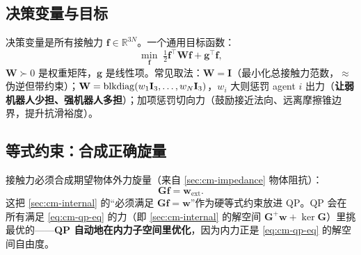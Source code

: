 \subsection{决策变量与目标}
\label{sec:cm-qp-obj}
决策变量是所有接触力 $\mathbf{f}\in\mathbb{R}^{3N}$。一个通用目标函数：
\begin{equation}
  \min_{\mathbf{f}}\;\tfrac{1}{2}\mathbf{f}^\top\mathbf{W}\mathbf{f}+\mathbf{g}^\top\mathbf{f},
  \label{eq:cm-qp-cost}
\end{equation}
$\mathbf{W}\succ 0$ 是权重矩阵，$\mathbf{g}$ 是线性项。常见取法：$\mathbf{W}=\mathbf{I}$（最小化总接触力范数，$\approx$ 伪逆但带约束）；$\mathbf{W}=\operatorname{blkdiag}(w_1\mathbf{I}_3,\dots,w_N\mathbf{I}_3)$，$w_i$ 大则惩罚 agent $i$ 出力（\textbf{让弱机器人少担、强机器人多担}）；加项惩罚切向力（鼓励接近法向、远离摩擦锥边界，提升抗滑裕度）。

\subsection{等式约束：合成正确旋量}
\label{sec:cm-qp-eq}
接触力必须合成期望物体外力旋量（来自 \cref{sec:cm-impedance} 物体阻抗）：
\begin{equation}
  \mathbf{G}\mathbf{f}=\mathbf{w}_{\text{ext}}.
  \label{eq:cm-qp-eq}
\end{equation}
这把 \cref{sec:cm-internal} 的“必须满足 $\mathbf{G}\mathbf{f}=\mathbf{w}$”作为硬等式约束放进 QP。QP 会在所有满足 \cref{eq:cm-qp-eq} 的力（即 \cref{sec:cm-internal} 的解空间 $\mathbf{G}^{+}\mathbf{w}+\ker\mathbf{G}$）里挑最优的——\textbf{QP 自动地在内力子空间里优化}，因为内力正是 \cref{eq:cm-qp-eq} 的解空间自由度。

